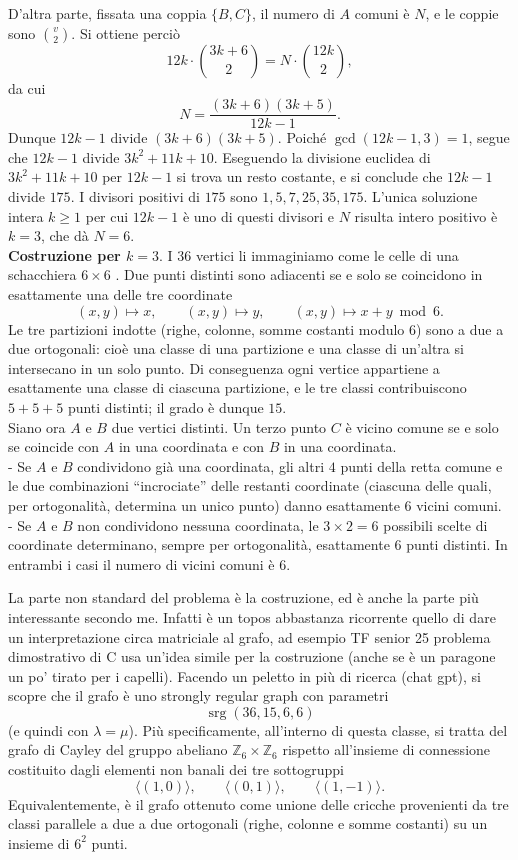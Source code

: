 \documentclass[11pt]{scrartcl}
\begin{document}
D’altra parte, fissata una coppia $\{B,C\}$, il numero di $A$ comuni è $N$,
e le coppie sono $\binom{v}{2}$. Si ottiene perciò
\[
12k\cdot\binom{3k+6}{2}=N\cdot\binom{12k}{2},
\]
da cui
\[
N=\frac{(3k+6)(3k+5)}{12k-1}.
\]
Dunque $12k-1$ divide $(3k+6)(3k+5)$. Poiché $\gcd(12k-1,3)=1$, segue che
$12k-1$ divide $3k^2+11k+10$. Eseguendo la divisione euclidea di $3k^2+11k+10$
per $12k-1$ si trova un resto costante, e si conclude che $12k-1$ divide $175$.
I divisori positivi di $175$ sono $1,5,7,25,35,175$.
L’unica soluzione intera $k\ge 1$ per cui $12k-1$ è uno di questi divisori e
$N$ risulta intero positivo è $k=3$, che dà $N=6$. \\
\textbf{Costruzione per $k=3$}.
I $36$ vertici li immaginiamo come le celle di una schacchiera $6 \times 6$ .
Due punti distinti sono adiacenti se e solo se coincidono in esattamente
una delle tre coordinate
\[
(x,y)\mapsto x,\qquad (x,y)\mapsto y,\qquad (x,y)\mapsto x+y\bmod 6.
\]
Le tre partizioni indotte (righe, colonne, somme costanti modulo 6) sono a due a due ortogonali:
cioè una classe di una partizione e una classe di un’altra si intersecano in un solo punto.
Di conseguenza ogni vertice appartiene a esattamente una classe di ciascuna partizione,
e le tre classi contribuiscono $5+5+5$ punti distinti; il grado è dunque $15$.\\
Siano ora $A$ e $B$ due vertici distinti. Un terzo punto $C$ è vicino comune se e solo se coincide con
$A$ in una coordinata e con $B$ in una coordinata.\\
- Se $A$ e $B$ condividono già una coordinata, gli altri $4$ punti della retta comune e
le due combinazioni “incrociate” delle restanti coordinate (ciascuna delle quali,
per ortogonalità, determina un unico punto) danno esattamente $6$ vicini comuni. \\
- Se $A$ e $B$ non condividono nessuna coordinata, le $3\times 2=6$ possibili scelte
di coordinate determinano, sempre per ortogonalità, esattamente $6$ punti distinti.
In entrambi i casi il numero di vicini comuni è $6$.
\begin{remark*}
La parte non standard del problema è la costruzione, ed è anche la parte
più interessante secondo me. Infatti è un topos abbastanza ricorrente quello di
dare un interpretazione circa matriciale al grafo, ad esempio TF senior 25 problema
dimostrativo di C usa un'idea simile per la costruzione (anche se è un paragone un po' tirato per i capelli).
Facendo un peletto in più di ricerca (chat
gpt), si scopre che il grafo è uno strongly regular graph con parametri
\[ \operatorname{srg}(36,15,6,6) \]
(e quindi con $  \lambda=\mu  $).
Più specificamente, all’interno di questa classe, si tratta del grafo di Cayley del
gruppo abeliano  $  \mathbb{Z}_6\times\mathbb{Z}_6  $ rispetto all’insieme
di connessione costituito dagli elementi non banali dei tre sottogruppi
\[\langle(1,0)\rangle,\qquad\langle(0,1)\rangle,\qquad\langle(1,-1)\rangle.\]
Equivalentemente, è il grafo ottenuto come unione delle cricche provenienti
da tre classi parallele a due a due ortogonali (righe, colonne e somme costanti)
su un insieme di $  6^2  $ punti.
\end{remark*}
\end{document}
